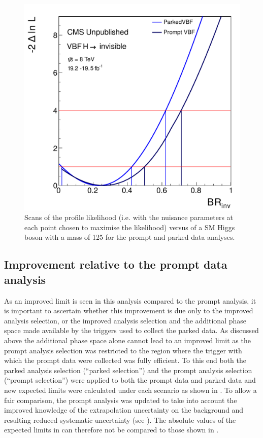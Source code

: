 \begin{figure}
  \includegraphics[width=\largefigwidth]{plots/parked/promptparkedscan.pdf}
  \caption{Scans of the profile likelihood (i.e. with the nuisance parameters at each point chosen to maximise the likelihood) versus \BRinv of a \ac{SM} Higgs boson with a mass of 125 \GeV for the prompt and parked data analyses.}
  \label{fig:parkedlikelihood}
\end{figure}

\subsection{Improvement relative to the prompt data analysis}
As an improved limit is seen in this analysis compared to the prompt analysis, it is important to ascertain whether this improvement is due only to the improved analysis selection, or the improved analysis selection and the additional phase space made available by the triggers used to collect the parked data. As discussed above the additional phase space alone cannot lead to an improved limit as the prompt analysis selection was restricted to the region where the trigger with which the prompt data were collected was fully efficient. To this end both the parked analysis selection (``parked selection'') and the prompt analysis selection (``prompt selection'') were applied to both the prompt data and parked data and new expected limits were calculated under each scenario as shown in . To allow a fair comparison, the prompt analysis was updated to take into account the improved knowledge of the extrapolation uncertainty on the \Znunu background and resulting reduced systematic uncertainty (see ). The absolute values of the expected limits in  can therefore not be compared to those shown in .

